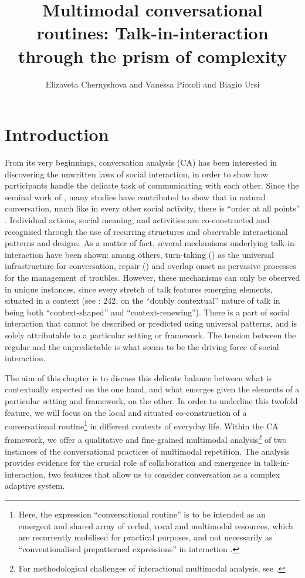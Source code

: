 \documentclass[output=paper]{langscibook}
\author{Elizaveta Chernyshova\affiliation{Skilder}
        and Vanessa Piccoli\affiliation{UMR 5161 ICAR; Centre National de la Recherche Scientifique; Ecole Normale Supérieure; Université Lumière Lyon 2}
        and Biagio Ursi\affiliation{UMR 5161 ICAR; Centre National de la Recherche Scientifique; Ecole Normale Supérieure; Université Lumière Lyon 2}}
\title[Multimodal conversational routines]
      {Multimodal conversational routines: Talk-in-interaction through the prism of complexity}
\begin{document}
\maketitle 

\section{Introduction}

From its very beginnings, conversation analysis (CA) has been interested in discovering the unwritten laws of social interaction, in order to show how participants handle the delicate task of communicating with each other. Since the seminal work of \citet{SacksEtAl1974}, many studies have contributed to show that in natural conversation, much like in every other social activity, there is “order at all points” \citep[22]{Sacks1984}. Individual actions, social meaning, and activities are co-constructed and recognised through the use of recurring structures and observable interactional patterns and designs. As a matter of fact, several mechanisms underlying talk-in-interaction have been shown: among others, turn-taking (\citealt{SacksEtAl1974}) as the universal infrastructure for conversation, repair (\citealt{SchegloffEtAl1977}) and overlap onset \citep{Jefferson1984} as pervasive processes for the management of troubles. However, these mechanisms can only be observed in unique instances, since every stretch of talk features emerging elements, situated in a context (see \citealt{Heritage1984}: 242, on the “doubly contextual” nature of talk in being both “context-shaped” and “context-renewing”). There is a part of social interaction that cannot be described or predicted using universal patterns, and is solely attributable to a particular setting or framework. The tension between the regular and the unpredictable is what seems to be the driving force of social interaction.

The aim of this chapter is to discuss this delicate balance between what is contextually expected on the one hand, and what emerges given the elements of a particular setting and framework, on the other. In order to underline this twofold feature, we will focus on the local and situated co-construction of a conversational routine\footnote{Here, the expression “conversational routine” is to be intended as an emergent and shared array of verbal, vocal and multimodal resources, which are recurrently mobilised for practical purposes, and not necessarily as “conventionalised prepatterned expressions” in interaction \citep[2--3]{Coulmas1981}.} in different contexts of everyday life. Within the CA framework, we offer a qualitative and fine-grained multimodal analysis\footnote{For methodological challenges of interactional multimodal analysis, see \citet{Mondada2018}.} of two instances of the conversational practices of multimodal repetition. The analysis provides evidence for the crucial role of collaboration and emergence in talk-in-interaction, two features that allow us to consider conversation as a complex adaptive system.
\end{document}
